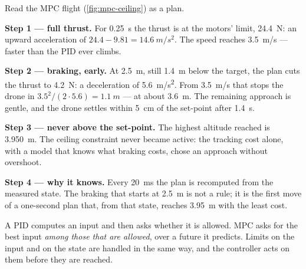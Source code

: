 
\begin{example}
\label{ex:mpc-plan}
Read the MPC flight (\cref{fig:mpc-ceiling}) as a plan.

\textbf{Step 1 — full thrust.} For \SI{0.25}{s} the thrust is at the motors' limit, \SI{24.4}{N}: an upward acceleration of $24.4 - 9.81 = \SI{14.6}{m/s^2}$. The speed reaches \SI{3.5}{m/s} — faster than the PID ever climbs.

\textbf{Step 2 — braking, early.} At \SI{2.5}{m}, still \SI{1.4}{m} below the target, the plan cuts the thrust to \SI{4.2}{N}: a deceleration of \SI{5.6}{m/s^2}. From \SI{3.5}{m/s} that stops the drone in $3.5^2/(2 \cdot 5.6) = \SI{1.1}{m}$ — at about \SI{3.6}{m}. The remaining approach is gentle, and the drone settles within \SI{5}{cm} of the set-point after \SI{1.4}{s}.

\textbf{Step 3 — never above the set-point.} The highest altitude reached is \SI{3.950}{m}. The ceiling constraint never became active: the tracking cost alone, with a model that knows what braking costs, chose an approach without overshoot.

\textbf{Step 4 — why it knows.} Every \SI{20}{ms} the plan is recomputed from the measured state. The braking that starts at \SI{2.5}{m} is not a rule; it is the first move of a one-second plan that, from that state, reaches \SI{3.95}{m} with the least cost.
\end{example}

\begin{keyidea}
A PID computes an input and then asks whether it is allowed. MPC asks for the best input \emph{among those that are allowed}, over a future it predicts. Limits on the input and on the state are handled in the same way, and the controller acts on them before they are reached.
\end{keyidea}


